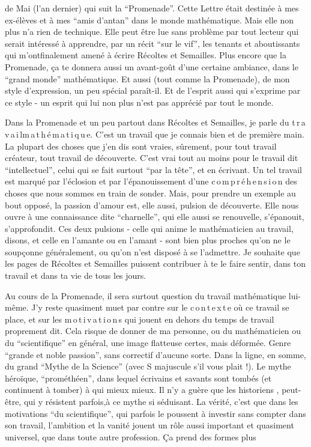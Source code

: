 
de Mai  (l'an dernier) qui suit la ``Promenade''. Cette Lettre était destinée à mes ex-élèves et à mes ``amis d'antan'' dans le monde mathématique. Mais elle non plus n'a rien de technique. Elle peut être lue sans problème par tout lecteur qui serait intéressé à apprendre, par un récit ``sur le vif'', les tenants et aboutissants qui m'ontfinalement amené à écrire Récoltes et Semailles. Plus encore que la Promenade, ça te donnera aussi un avant-goût d'une certaine ambiance, dans le ``grand monde'' mathématique. Et aussi (tout comme la Promenade), de mon style d'expression, un peu spécial paraît-il. Et de l'esprit aussi qui s'exprime par ce style - un esprit qui lui non plus n'est pas apprécié par tout le monde.

Dans la Promenade et un peu partout dans Récoltes et Semailles, je parle du t\,r\,a\,v\,a\,i\,l\quad m\,a\,t\,h\,é\,m\,a\,t\,i\,q\,u\,e. C'est un travail que je connais bien et de première main. La plupart des choses que j'en dis sont vraies, sûrement, pour tout travail créateur, tout travail de découverte. C'est vrai tout au moins pour le travail dit ``intellectuel'', celui qui se fait surtout ``par la tête'', et en écrivant. Un tel travail est marqué par l'éclosion et par l'épanouissement d'une c\,o\,m\,p\,r\,é\,h\,e\,n\,s\,i\,o\,n des choses que nous sommes en train de sonder. Mais, pour prendre un exemple au bout opposé, la passion d'amour est, elle aussi, pulsion de découverte. Elle nous ouvre à une connaissance dite ``charnelle'', qui elle aussi se renouvelle, s'épanouit, s'approfondit. Ces deux pulsions - celle qui anime le mathématicien au travail, disons, et celle en l'amante ou en l'amant - sont bien plus proches qu'on ne le soupçonne généralement, ou qu'on n'est disposé à se l'admettre. Je souhaite que les pages de Récoltes et Semailles puissent contribuer à te le faire sentir, dans ton travail et dans ta vie de tous les jours.

Au cours de la Promenade, il sera surtout question du travail mathématique lui-même. J'y reste quasiment muet par contre sur le c\,o\,n\,t\,e\,x\,t\,e où ce travail se place, et sur les m\,o\,t\,i\,v\,a\,t\,i\,o\,n\,s qui jouent en dehors du temps de travail proprement dit. Cela risque de donner de ma personne, ou du mathématicien ou du ``scientifique'' en général, une image flatteuse certes, mais déformée. Genre ``grande et noble passion'', sans correctif d'aucune sorte. Dans la ligne, en somme, du grand ``Mythe de la Science'' (avec S majuscule s'il vous plait !). Le mythe héroïque, ``prométhéen'', dans lequel écrivains et savants sont tombés (et continuent à tomber) à qui mieux mieux. Il n'y a guère que les historiens , peut-être, qui y résistent parfois,à ce mythe si séduisant. La vérité, c'est que dans les motivations ``du scientifique'', qui parfois le poussent à investir sans compter dans son travail, l'ambition et la vanité jouent un rôle aussi important et quasiment universel, que dans toute autre profession. Ça prend des formes plus

